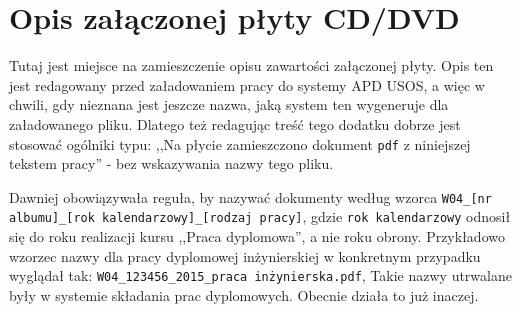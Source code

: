 \chapter{Opis załączonej płyty CD/DVD}\label{chap:opis-plyty}
Tutaj jest miejsce na zamieszczenie opisu zawartości załączonej płyty. Opis ten jest redagowany przed załadowaniem pracy do systemy APD USOS, a więc w chwili, gdy nieznana jest jeszcze nazwa, jaką system ten wygeneruje dla załadowanego pliku. Dlatego też redagując treść tego dodatku dobrze jest stosować ogólniki typu:{ },,Na płycie zamieszczono dokument \texttt{pdf} z niniejszej tekstem pracy'' {-} bez wskazywania nazwy tego pliku. 

Dawniej obowiązywała reguła, by nazywać dokumenty według wzorca \texttt{W04\_[nr albumu]\_[rok kalendarzowy]\_[rodzaj pracy]}, gdzie \texttt{rok kalendarzowy} odnosił się do roku realizacji kursu{ },,Praca dyplomowa'', a nie roku obrony. Przykładowo wzorzec nazwy dla pracy dyplomowej inżynierskiej w konkretnym przypadku wyglądał tak: \texttt{W04\_123456\_2015\_praca inżynierska.pdf},  Takie nazwy utrwalane były w systemie składania prac dyplomowych. Obecnie działa to już inaczej.